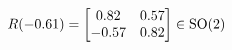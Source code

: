 \documentclass[preview]{standalone}
\begin{document}
\begin{align*}
\special{dvisvgm:raw <g id='unique000'>}R(-0.61) = \begin{bmatrix} 0.82 & 0.57 \\ -0.57 & 0.82 \end{bmatrix} \in \text{SO}(2)\special{dvisvgm:raw </g>}
\end{align*}
\end{document}
